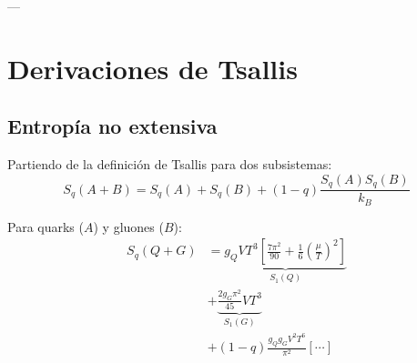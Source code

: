 




---

\section{Derivaciones de Tsallis}\label{app:Tsallis}

\subsection{Entropía no extensiva}\label{app:Tsallis-entropy}
Partiendo de la definición de Tsallis para dos subsistemas:
\begin{equation}
{S}_q(A+B) = {S}_q(A) + {S}_q(B) + (1-q)\frac{{S}_q(A){S}_q(B)}{k_B}
\end{equation}

Para quarks ($A$) y gluones ($B$):
\begin{align}
{S}_q(Q+G) &= \underbrace{{g}_Q V T^3 \left[\frac{7\pi^2}{90} + \frac{1}{6}\left(\frac{\mu}{T}\right)^2\right]}_{{S}_1(Q)} \nonumber \\
&+ \underbrace{\frac{2g_G\pi^2}{45}V T^3}_{{S}_1(G)} \nonumber \\
&+ (1-q) \frac{{g}_Q g_G V^2 T^6}{\pi^2} \left[\cdots\right]
\end{align}


